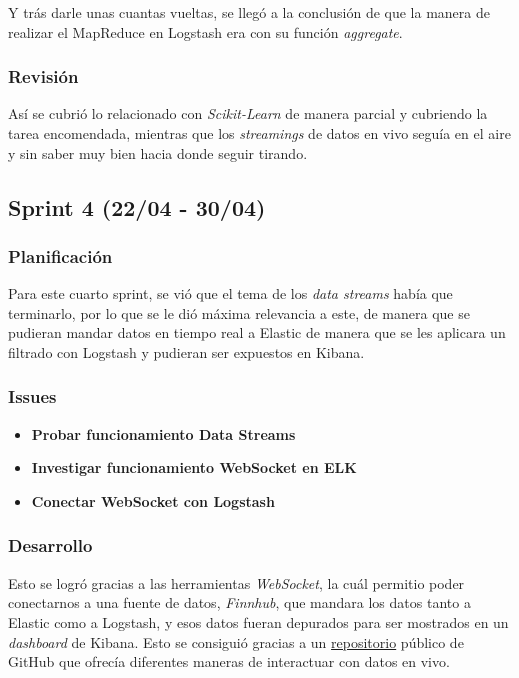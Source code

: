 Y trás darle unas cuantas vueltas, se llegó a la conclusión de que la manera de realizar el MapReduce en Logstash era con su función \textit{aggregate}.

\subsubsection{Revisión}
Así se cubrió lo relacionado con \textit{Scikit-Learn} de manera parcial y cubriendo la tarea encomendada, mientras que los \textit{streamings} de datos en vivo seguía en el aire y sin saber muy bien hacia donde seguir tirando.

\subsection{Sprint 4 (22/04 - 30/04)}
\subsubsection{Planificación}
Para este cuarto sprint, se vió que el tema de los \textit{data streams} había que terminarlo, por lo que se le dió máxima relevancia a este, de manera que se pudieran mandar datos en tiempo real a Elastic de manera que se les aplicara un filtrado con Logstash y pudieran ser expuestos en Kibana.

\subsubsection{Issues}
\begin{itemize}
        \item \textbf{Probar funcionamiento Data Streams}   
    \item \textbf{Investigar funcionamiento WebSocket en ELK}
        \item \textbf{Conectar WebSocket con Logstash}
\end{itemize}

\subsubsection{Desarrollo}
Esto se logró gracias a las herramientas \textit{WebSocket}, la cuál permitio poder conectarnos a una fuente de datos, \textit{Finnhub}, que mandara los datos tanto a Elastic como a Logstash, y esos datos fueran depurados para ser mostrados en un \textit{dashboard} de Kibana. Esto se consiguió gracias a un \href{https://github.com/ColinEberhardt/awesome-public-streaming-datasets}{repositorio} público de GitHub que ofrecía diferentes maneras de interactuar con datos en vivo.


